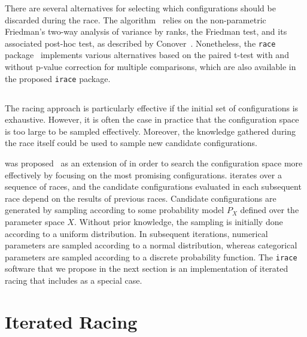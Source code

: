 \documentclass[a4paper]{article}
\newcommand{\irace}{\texttt{irace}\xspace}
\newcommand{\IFRACE}{\text{I/F-Race}\xspace}
\newcommand{\FRACE}{\text{F-Race}\xspace}
\begin{document}


There are several alternatives for selecting which configurations
should be discarded during the race. The \FRACE
algorithm~\cite{Birattari09tuning,BirStuPaqVar02:gecco} relies on the
non-parametric Friedman's two-way analysis of variance by ranks, the
Friedman test, and its associated post-hoc test, as described by
Conover~\cite{Conover99:pns}. Nonetheless, the \texttt{race}
package~\cite{IRIDIA-2003-037} implements various alternatives based
on the paired t-test with and without p-value correction for multiple
comparisons, which are also available in the proposed \texttt{irace}
package.

\subsection{\IFRACE}

The racing approach is particularly effective if the initial set of
configurations is exhaustive. However, it is often the case in
practice that the configuration space is too large to be sampled
effectively. Moreover, the knowledge gathered during the race itself
could be used to sample new candidate configurations. 

\IFRACE was proposed~\cite{BalBirStu07,BirYuaBal2010:emaoa} as an
extension of \FRACE in order to search the configuration space more
effectively by focusing on the most promising configurations. \IFRACE
iterates over a sequence of races, and the candidate configurations
evaluated in each subsequent race depend on the results of previous
races. Candidate configurations are generated by sampling according to
some probability model $P_X$ defined over the parameter space
$X$. Without prior knowledge, the sampling is initially done according
to a uniform distribution. In subsequent iterations, numerical
parameters are sampled according to a normal distribution, whereas
categorical parameters are sampled according to a discrete probability
function. The \irace software that we propose in the next section is
an implementation of iterated racing that includes \IFRACE as a
special case.


\section{Iterated Racing}\label{sec:irace}
\end{document}
